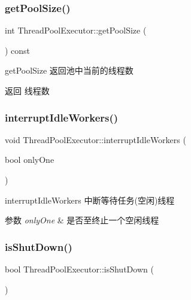 \subsubsection{\texorpdfstring{get\+Pool\+Size()}{getPoolSize()}}
{\footnotesize\ttfamily int Thread\+Pool\+Executor\+::get\+Pool\+Size (\begin{DoxyParamCaption}{ }\end{DoxyParamCaption}) const}



get\+Pool\+Size 返回池中当前的线程数 

\begin{DoxyReturn}{返回}
线程数 
\end{DoxyReturn}
\mbox{\label{classThreadPoolExecutor_a7e73a64e24e93e9dc25cf2baeda4a0cb}} 
\subsubsection{\texorpdfstring{interrupt\+Idle\+Workers()}{interruptIdleWorkers()}}
{\footnotesize\ttfamily void Thread\+Pool\+Executor\+::interrupt\+Idle\+Workers (\begin{DoxyParamCaption}\item[{bool}]{only\+One }\end{DoxyParamCaption})}



interrupt\+Idle\+Workers 中断等待任务(空闲)线程 


\begin{DoxyParams}{参数}
{\em only\+One} & 是否至终止一个空闲线程 \\
\hline
\end{DoxyParams}
\mbox{\label{classThreadPoolExecutor_ab2306274cb488e3bcf4d14f6042373f7}} 
\subsubsection{\texorpdfstring{is\+Shut\+Down()}{isShutDown()}}
{\footnotesize\ttfamily bool Thread\+Pool\+Executor\+::is\+Shut\+Down (\begin{DoxyParamCaption}{ }\end{DoxyParamCaption})}



